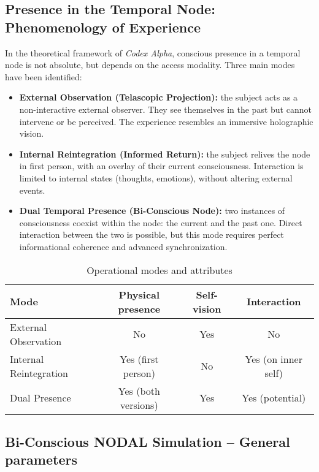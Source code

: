 \documentclass[12pt]{article}
\begin{document}
\subsection*{Presence in the Temporal Node: Phenomenology of Experience}

In the theoretical framework of \textit{Codex Alpha}, conscious presence in a temporal node is not absolute, but depends on the access modality. Three main modes have been identified:
\begin{itemize}
    \item \textbf{External Observation (Telascopic Projection):} the subject acts as a non-interactive external observer. They see themselves in the past but cannot intervene or be perceived. The experience resembles an immersive holographic vision.
    
    \item \textbf{Internal Reintegration (Informed Return):} the subject relives the node in first person, with an overlay of their current consciousness. Interaction is limited to internal states (thoughts, emotions), without altering external events.

    \item \textbf{Dual Temporal Presence (Bi-Conscious Node):} two instances of consciousness coexist within the node: the current and the past one. Direct interaction between the two is possible, but this mode requires perfect informational coherence and advanced synchronization.
\end{itemize}

\begin{table}[H]
\centering
\caption*{Operational modes and attributes}
\begin{tabular}{lccc}
\toprule
\textbf{Mode} & \textbf{Physical presence} & \textbf{Self-vision} & \textbf{Interaction} \\
\midrule
External Observation & No & Yes & No \\
Internal Reintegration & Yes (first person) & No & Yes (on inner self) \\
Dual Presence & Yes (both versions) & Yes & Yes (potential) \\
\bottomrule
\end{tabular}
\end{table}

\subsection*{Bi-Conscious NODAL Simulation – General parameters}
\end{document}
